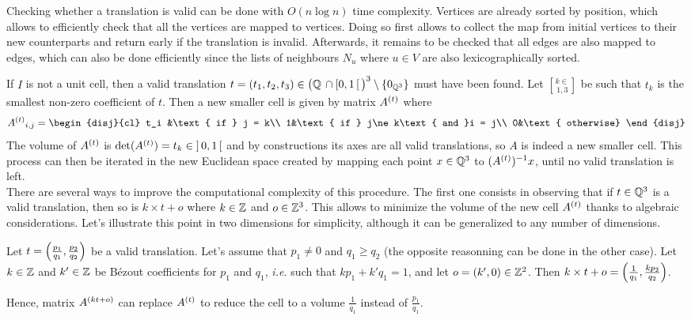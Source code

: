 \documentclass[main.tex]{subfiles}
\begin{document}
Checking whether a translation is valid can be done with $O(n\log n)$ time complexity. Vertices are already sorted by position, which allows to efficiently check that all the vertices are mapped to vertices. Doing so first allows to collect the map from initial vertices to their new counterparts and return early if the translation is invalid. Afterwards, it remains to be checked that all edges are also mapped to edges, which can also be done efficiently since the lists of neighbours $N_u$ where $u\in V$ are also lexicographically sorted.

If $I$ is not a unit cell, then a valid translation $t = (t_1,t_2,t_3)\in\big(\mathbb{Q}\,\cap\left[0,1\,\right[\big)^3\setminus\{0_{\mathbb{Q}^3}\}$ must have been found. Let $k\in\brack{1,3}$ be such that $t_k$ is the smallest non-zero coefficient of $t$. Then a new smaller cell is given by matrix $A^{\left(t\right)}$ where
\[{\der At}_{i,j} = \begin{disj}{cl}
	t_i &\text{ if } j = k\\
	1&\text{ if } j\ne k\text{ and }i = j\\
	0&\text{ otherwise}
\end{disj}\]
The volume of $A^{\left(t\right)}$ is $\det(A^{\left(t\right)}) = t_k\in\left]\,0,1\,\right[$ and by constructions its axes are all valid translations, so $A$ is indeed a new smaller cell. This process can then be iterated in the new Euclidean space created by mapping each point $x\in\mathbb{Q}^3$ to $(A^{\left(t\right)})^{-1}x$, until no valid translation is left.\\

There are several ways to improve the computational complexity of this procedure. The first one consists in observing that if $t\in\mathbb{Q}^3$ is a valid translation, then so is $k\times t + o$ where $k\in\mathbb{Z}$ and $o\in\mathbb{Z}^3$. This allows to minimize the volume of the new cell $A^{\left(t\right)}$ thanks to algebraic considerations. Let's illustrate this point in two dimensions for simplicity, although it can be generalized to any number of dimensions.

Let $t =\left(\frac{p_1}{q_1}, \frac{p_2}{q_2}\right)$ be a valid translation. Let's assume that $p_1\ne0$ and $q_1 \ge q_2$ (the opposite reasonning can be done in the other case). Let $k\in\mathbb{Z}$ and $k'\in\mathbb{Z}$ be B\'{e}zout coefficients for $p_1$ and $q_1$, \textit{i.e.} such that $kp_1 + k'q_1 = 1$, and let $o = (k', 0)\in\mathbb{Z}^2$. Then $k\times t + o = \left(\frac1{q_1}, \frac{kp_2}{q_2}\right)$.

Hence, matrix $A^{\left(kt+o\right)}$ can replace $A^{\left(t\right)}$ to reduce the cell to a volume $\frac1{q_1}$ instead of $\frac{p_1}{q_1}$.\\
\end{document}
